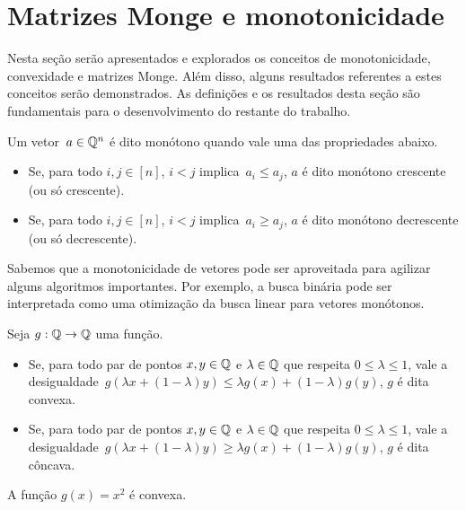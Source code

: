 \section{Matrizes Monge e monotonicidade}
\label{Monge}


Nesta seção serão apresentados e explorados os conceitos de monotonicidade, convexidade e matrizes Monge. Além disso, alguns resultados referentes a estes conceitos serão demonstrados. As definições e os resultados desta seção são fundamentais para o desenvolvimento do restante do trabalho.  

\begin{defi}
Um vetor~${ a \in \mathbb{Q}^n }$ é dito monótono quando vale uma das propriedades abaixo.
\begin{itemize}
    \item Se, para todo $i,j \in [n]$, $i < j$ implica~$a_i \leq a_j$, $a$ é dito monótono crescente (ou só crescente).
    \item Se, para todo $i,j \in [n]$, $i < j$ implica~$a_i \geq a_j$, $a$ é dito monótono decrescente (ou só decrescente).
\end{itemize}
\end{defi}

Sabemos que a monotonicidade de vetores pode ser aproveitada para agilizar alguns algoritmos importantes. Por exemplo, a busca binária pode ser interpretada como uma otimização da busca linear para vetores monótonos. 

\begin{defi}
Seja $g : \mathbb{Q} \to \mathbb{Q}$ uma função.
\begin{itemize}
    \item Se, para todo par de pontos $x,y \in \mathbb{Q}$ e $\lambda \in \mathbb{Q}$ que respeita $0 \leq \lambda \leq 1$, vale a desigualdade~${g(\lambda x + (1 - \lambda)y) \leq \lambda g(x) + (1 - \lambda) g(y)}$, $g$ é dita convexa.
    \item Se, para todo par de pontos $x,y \in \mathbb{Q}$ e $\lambda \in \mathbb{Q}$ que respeita $0 \leq \lambda \leq 1$, vale a desigualdade~${g(\lambda x + (1 - \lambda)y) \geq \lambda g(x) + (1 - \lambda) g(y)}$, $g$ é dita côncava.
\end{itemize}
\end{defi}

\begin{prop} \label{Monge:sqConv}
A função $g(x) = x^2$ é convexa. 
\end{prop}

